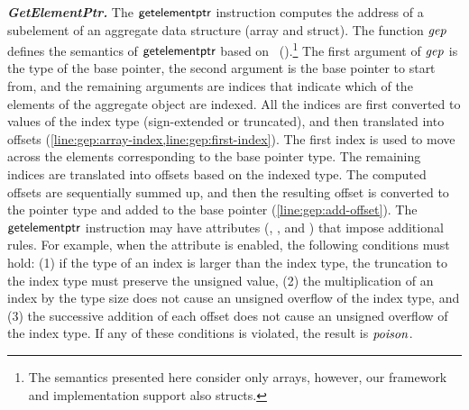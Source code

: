 \textbf{\textit{GetElementPtr.}}
The $\textsf{getelementptr}$ instruction computes the address of a subelement of an aggregate data structure (\eg array and struct).
The function $\mathit{gep}$ defines the semantics of $\textsf{getelementptr}$ based on~ ().\footnote{
The semantics presented here consider only arrays, however, our framework and implementation support also structs.
}
The first argument of $\mathit{gep}$ is the type of the base pointer,
the second argument is the base pointer to start from,
and the remaining arguments are indices that indicate which of the elements of the aggregate object are indexed.
All the indices are first converted to values of the index type (sign-extended or truncated), and then translated into offsets (\cref{line:gep:array-index,line:gep:first-index}).
The first index is used to move across the elements corresponding to the base pointer type.
The remaining indices are translated into offsets based on the indexed type.
The computed offsets are sequentially summed up,
and then the resulting offset is converted to the pointer type and added to the base pointer (\cref{line:gep:add-offset}).
%
The $\textsf{getelementptr}$ instruction may have attributes (, , and ) that impose additional rules.
For example, when the  attribute is enabled, the following conditions must hold:
(1) if the type of an index is larger than the index type, the truncation to the index type must preserve the unsigned value,
(2) the multiplication of an index by the type size does not cause an unsigned overflow of the index type, and
(3) the successive addition of each offset does not cause an unsigned overflow of the index type.
If any of these conditions is violated, the result is $\mathit{poison}$.




